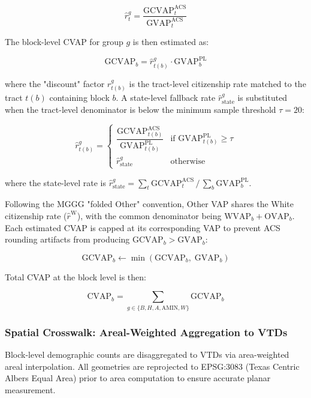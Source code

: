\documentclass[sn-vancouver,Numbered]{sn-jnl}
\theoremstyle{thmstyleone}%
\theoremstyle{thmstyletwo}%
\theoremstyle{thmstylethree}%
\begin{document}
\begin{equation}
\hat{r}^g_t = \frac{\text{GCVAP}^\text{ACS}_t}{\text{GVAP}^\text{ACS}_t}
\label{eq:tractlevelcitizenshiprate}
\end{equation}

The block-level CVAP for group $g$ is then estimated as:

\begin{equation}
\text{GCVAP}_b = \hat{r}^g_{t(b)} \cdot \text{GVAP}^\text{PL}_b
\label{eq:blocklevelcvap}
\end{equation}

where the "discount" factor $\hat{r}^g_{t(b)}$ is the tract-level citizenship rate matched to the tract $t(b)$ containing block $b$. A state-level fallback rate $\hat{r}^g_{\text{state}}$ is substituted when the tract-level denominator is below the minimum sample threshold $\tau = 20$:

\begin{equation}
\hat{r}^g_{t(b)} = \begin{cases} \dfrac{\text{GCVAP}^\text{ACS}_{t(b)}}{\text{GVAP}^\text{PL}_{t(b)}} & \text{if } \text{GVAP}^\text{PL}_{t(b)} \geq \tau \\[10pt] \hat{r}^g_{\text{state}} & \text{otherwise} \end{cases}
\label{eq:discounting}
\end{equation}

where the state-level rate is $\hat{r}^g_{\text{state}} = \sum_t \text{GCVAP}^\text{ACS}_t \,/\, \sum_b \text{GVAP}^\text{PL}_b$.

Following the MGGG "folded Other" convention, Other VAP shares the White citizenship rate ($\hat{r}^\text{W}$), with the common denominator being $\text{WVAP}_b + \text{OVAP}_b$. Each estimated CVAP is capped at its corresponding VAP to prevent ACS rounding artifacts from producing $\text{GCVAP}_b > \text{GVAP}_b$:

\begin{equation}
\text{GCVAP}_b \leftarrow \min\!\left(\text{GCVAP}_b,\; \text{GVAP}_b\right)
\end{equation}

Total CVAP at the block level is then:

\begin{equation}
\text{CVAP}_b = \sum_{g \in \{B,H,A,\text{AMIN},W\}} \text{GCVAP}_b  
\end{equation}

\subsubsection{Spatial Crosswalk: Areal-Weighted Aggregation to VTDs}
Block-level demographic counts are disaggregated to VTDs via area-weighted areal interpolation. All geometries are reprojected to EPSG:3083 (Texas Centric Albers Equal Area) prior to area computation to ensure accurate planar measurement.
\end{document}
